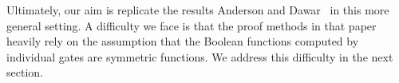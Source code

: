 \documentclass[../paper.tex]{subfiles}
\begin{document}
Ultimately, our aim is replicate the results Anderson and
Dawar~\cite{AndersonD17} in this more general setting. A difficulty we face is
that the proof methods in that paper heavily rely on the assumption that the
Boolean functions computed by individual gates are symmetric functions. We
address this difficulty in the next section.



\end{document}
